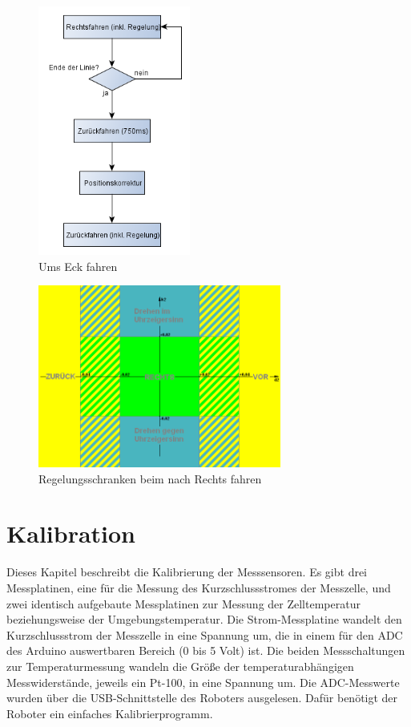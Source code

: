 \documentclass[a4paper,bibtotoc,oneside]{scrbook}
\begin{document}
\begin{figure}[htbp]
\centering
\includegraphics[width=50mm]{img/ecke2.png}
\caption{Ums Eck fahren}\label{eck}
\end{figure}

\begin{figure}[htbp]
\centering
\includegraphics[width=80mm]{img/regelung2.png}
\caption{Regelungsschranken beim nach Rechts fahren}\label{reg}
\end{figure}






\chapter{Kalibration}\thispagestyle{empty}

Dieses Kapitel beschreibt die Kalibrierung der Messsensoren. Es gibt drei Messplatinen, eine für die Messung des Kurzschlussstromes der Messzelle, und zwei identisch aufgebaute Messplatinen zur Messung der Zelltemperatur beziehungsweise der Umgebungstemperatur. Die Strom-Messplatine wandelt den Kurzschlussstrom der Messzelle in eine Spannung um, die in einem für den ADC des Arduino auswertbaren Bereich (0 bis 5 Volt) ist. Die beiden Messschaltungen zur Temperaturmessung wandeln die Größe der temperaturabhängigen Messwiderstände, jeweils ein Pt-100, in eine Spannung um.
Die ADC-Messwerte wurden über die USB-Schnittstelle des Roboters ausgelesen. Dafür benötigt der Roboter ein einfaches Kalibrierprogramm.
\end{document}
